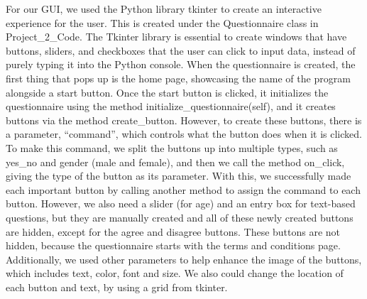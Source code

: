﻿\documentclass[12pt]{article}
\begin{document}
For our GUI, we used the Python library tkinter to create an interactive experience for the user. This is created under the Questionnaire class in Project\_2\_Code.  The Tkinter library is essential to create windows that have buttons, sliders, and checkboxes that the user can click to input data, instead of purely typing it into the Python console. When the questionnaire is created, the first thing that pops up is the home page, showcasing the name of the program alongside a start button. Once the start button is clicked, it initializes the questionnaire using the method initialize\_questionnaire(self), and it creates buttons via the method create\_button. However, to create these buttons, there is a parameter, “command”, which controls what the button does when it is clicked. To make this command, we split the buttons up into multiple types, such as yes\_no and gender (male and female), and then we call the method on\_click, giving the type of the button as its parameter. With this, we successfully made each important button by calling another method to assign the command to each button. However, we also need a slider (for age) and an entry box for text-based questions, but they are manually created and all of these newly created buttons are hidden, except for the agree and disagree buttons. These buttons are not hidden, because the questionnaire starts with the terms and conditions page. Additionally, we used other parameters to help enhance the image of the buttons, which includes text, color, font and size. We also could change the location of each button and text, by using a grid from tkinter.
\end{document}
